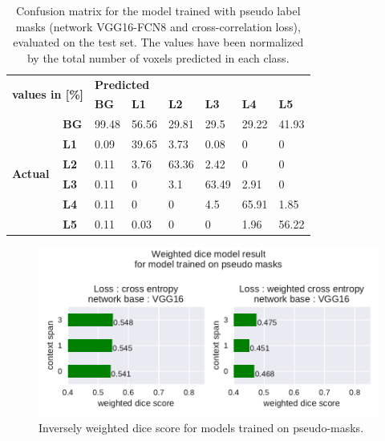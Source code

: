 \begin{table}
 

\begin{tabular}{ll|llllll}
    \toprule
    \multicolumn{2}{l|}{\multirow{2}{*}{\textbf{values in {[}\%{]}}}} & \multicolumn{6}{l}{\textbf{Predicted}}                                            \\
    \multicolumn{2}{l|}{}                                             & \textbf{BG} & \textbf{L1} & \textbf{L2} & \textbf{L3} & \textbf{L4} & \textbf{L5} \\ \hline
    \multirow{6}{*}{\textbf{Actual}}           & \textbf{BG}          & 99.48       & 56.56       & 29.81       & 29.5        & 29.22       & 41.93       \\
     & \textbf{L1} & 0.09 & 39.65 & 3.73  & 0.08  & 0     & 0     \\
     & \textbf{L2} & 0.11 & 3.76  & 63.36 & 2.42  & 0     & 0     \\
     & \textbf{L3} & 0.11 & 0     & 3.1   & 63.49 & 2.91  & 0     \\
     & \textbf{L4} & 0.11 & 0     & 0     & 4.5   & 65.91 & 1.85  \\
     & \textbf{L5} & 0.11 & 0.03  & 0     & 0     & 1.96  & 56.22 \\ \bottomrule
    \end{tabular}

    \caption{Confusion matrix for the model trained with pseudo label masks (network VGG16-FCN8 and cross-correlation loss), evaluated on the test set.
    The values have been normalized by the total number of voxels predicted in each class.
    \label{tab:pseudo_confusionMatrix}
    }
\end{table}

\begin{figure}
        \includegraphics[width=.99\textwidth]{images/PseudoSupervised.pdf}
        \caption{Inversely weighted dice score for models trained on pseudo-masks. \label{fig:PseudoSupervised_dice}}
        
\end{figure}

